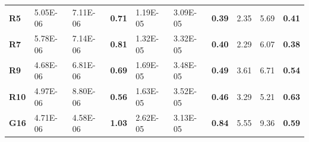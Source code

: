 \documentclass[encoding=utf8,british]{tumphthesis}
\begin{document}
\begin{table}[H]
\begin{subtable}{1\textwidth}
{\begin{tabular}{|l|llr|llr|llr|}
\rowcolor[HTML]{CFE2F3} 
\textbf{R5}                               & 5.05E-06                                             & 7.11E-06                                              & \textbf{0.71}                                    & 1.19E-05                                            & 3.09E-05                                              & \textbf{0.39}                                    & 2.35                                                 & 5.69                                                  & \textbf{0.41}                                    \\
\textbf{R7}                               & 5.78E-06                                             & 7.14E-06                                              & \textbf{0.81}                                    & 1.32E-05                                             & 3.32E-05                                              & \textbf{0.40}                                    & 2.29                                                 & 6.07                                                  & \textbf{0.38}                                    \\
\rowcolor[HTML]{CFE2F3} 
\textbf{R9}                               & 4.68E-06                                             & 6.81E-06                                              & \textbf{0.69}                                    & 1.69E-05                                             & 3.48E-05                                              & \textbf{0.49}                                    & 3.61                                                 & 6.71                                                  & \textbf{0.54}                                    \\
\textbf{R10}                              & 4.97E-06                                             & 8.80E-06                                              & \textbf{0.56}                                    & 1.63E-05                                             & 3.52E-05                                              & \textbf{0.46}                                    & 3.29                                                 & 5.21                                                  & \textbf{0.63}                                    \\
\rowcolor[HTML]{CFE2F3} 
\textbf{G16}                              & 4.71E-06                                             & 4.58E-06                                              & \textbf{1.03}                                    & 2.62E-05                                             & 3.13E-05                                              & \textbf{0.84}                                    & 5.55                                                 & 9.36                                                  & \textbf{0.59}                                    \\ \hline

\end{tabular}}
\end{subtable}
\end{table}
\end{document}
